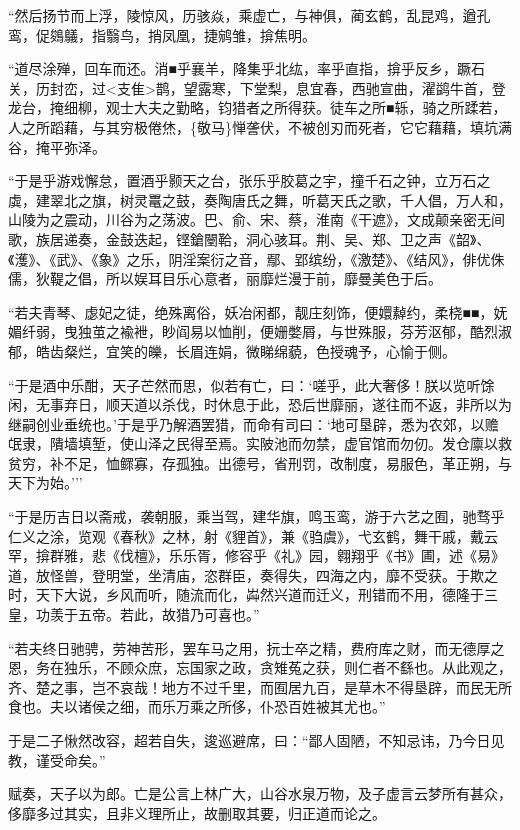 \documentclass[]{article}
\begin{document}
``然后扬节而上浮，陵惊风，历骇焱，乘虚亡，与神俱，蔺玄鹤，乱昆鸡，遒孔鸾，促鵕鸃，指翳鸟，捎凤凰，捷鹓雏，揜焦明。

``道尽涂殚，回车而还。消■乎襄羊，降集乎北纮，率乎直指，揜乎反乡，蹶石关，历封峦，过\textless{}支隹\textgreater{}鹊，望露寒，下堂梨，息宜春，西驰宣曲，濯鹢牛首，登龙台，掩细柳，观士大夫之勤略，钧猎者之所得获。徒车之所■轹，骑之所蹂若，人之所蹈藉，与其穷极倦烋，\{敬马\}惮詟伏，不被创刃而死者，它它藉藉，填坑满谷，掩平弥泽。

``于是乎游戏懈怠，置酒乎颢天之台，张乐乎胶葛之宇，撞千石之钟，立万石之虡，建翠北之旗，树灵鼍之鼓，奏陶唐氏之舞，听葛天氏之歌，千人倡，万人和，山陵为之震动，川谷为之荡波。巴、俞、宋、蔡，淮南《干遮》，文成颠亲密无间歌，族居递奏，金鼓迭起，铿鎗闛鞈，洞心骇耳。荆、吴、郑、卫之声《韶》、《濩》、《武》、《象》之乐，阴淫案衍之音，鄢、郢缤纷，《激楚》、《结风》，俳优侏儒，狄鞮之倡，所以娱耳目乐心意者，丽靡烂漫于前，靡曼美色于后。

``若夫青琴、虙妃之徒，绝殊离俗，妖冶闲都，靓庄刻饰，便嬛繛约，柔桡■■，妩媚纤弱，曳独茧之褕袣，眇阎易以恤削，便姗嫳屑，与世殊服，芬芳沤郁，酷烈淑郁，皓齿粲烂，宜笑的皪，长眉连娟，微睇绵藐，色授魂予，心愉于侧。

``于是酒中乐酣，天子芒然而思，似若有亡，曰：`嗟乎，此大奢侈！朕以览听馀闲，无事弃日，顺天道以杀伐，时休息于此，恐后世靡丽，遂往而不返，非所以为继嗣创业垂统也。'于是乎乃解酒罢猎，而命有司曰：`地可垦辟，悉为农郊，以赡氓隶，隤墙填堑，使山泽之民得至焉。实陂池而勿禁，虚官馆而勿仞。发仓廪以救贫穷，补不足，恤鳏寡，存孤独。出德号，省刑罚，改制度，易服色，革正朔，与天下为始。'''

``于是历吉日以斋戒，袭朝服，乘当驾，建华旗，鸣玉鸾，游于六艺之囿，驰骛乎仁义之涂，览观《春秋》之林，射《貍首》，兼《驺虞》，弋玄鹤，舞干戚，戴云罕，揜群雅，悲《伐檀》，乐乐胥，修容乎《礼》园，翱翔乎《书》圃，述《易》道，放怪兽，登明堂，坐清庙，恣群臣，奏得失，四海之内，靡不受获。于欺之时，天下大说，乡风而听，随流而化，芔然兴道而迁义，刑错而不用，德隆于三皇，功羡于五帝。若此，故猎乃可喜也。''

``若夫终日驰骋，劳神苦形，罢车马之用，抏士卒之精，费府库之财，而无德厚之恩，务在独乐，不顾众庶，忘国家之政，贪雉菟之获，则仁者不繇也。从此观之，齐、楚之事，岂不哀哉！地方不过千里，而囿居九百，是草木不得垦辟，而民无所食也。夫以诸侯之细，而乐万乘之所侈，仆恐百姓被其尤也。''

于是二子愀然改容，超若自失，逡巡避席，曰：``鄙人固陋，不知忌讳，乃今日见教，谨受命矣。''

赋奏，天子以为郎。亡是公言上林广大，山谷水泉万物，及子虚言云梦所有甚众，侈靡多过其实，且非义理所止，故删取其要，归正道而论之。
\end{document}
